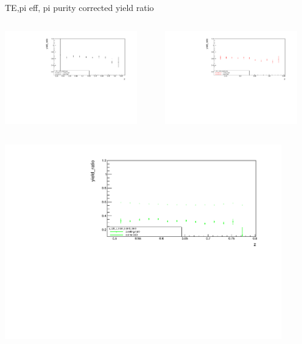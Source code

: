 \begin{frame}{TE,pi eff, pi purity corrected yield ratio}
\begin{columns}
\begin{column}[T]{0.5\textwidth}
\includegraphics[width = 0.9\textwidth]{results/yield/statistics_corr/x_Q2_z_50_5500_40_ratio.pdf}
\end{column}
\begin{column}[T]{0.5\textwidth}
\includegraphics[width = 0.9\textwidth]{results/yield/statistics_corr/x_Q2_z_50_5500_50_ratio.pdf}
\end{column}
\end{columns}
\begin{columns}
\begin{column}[T]{0.5\textwidth}
\includegraphics[width = 0.9\textwidth]{results/yield/statistics_corr/x_Q2_z_50_5500_60_ratio.pdf}

\end{column}
\end{columns}
\end{frame}
